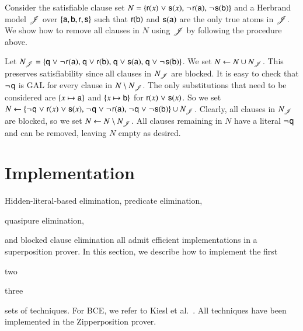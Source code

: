 \begin{exa}
   Consider the satisfiable clause set $N = \{{\mathsf{r}(x)} \mathrel{\lor}
   {\mathsf{s}(x)}{,}\; \neg{\kern.2ex \mathsf{r}(\mathsf{a})}{,}\allowbreak\;
   \neg{\kern.2ex \mathsf{s}(\mathsf{b})}\}$ and a Herbrand model $\mathscr{J}$ over
   $\{\mathsf{a}, \mathsf{b}, \mathsf{r}, \mathsf{s}\}$ such that
   $\mathsf{r}(\mathsf{b})$ and $\mathsf{s}(\mathsf{a})$ are the only true atoms in
   $\mathscr{J}$. We show how to remove all clauses in $N$ using $\mathscr{J}$ 
   by following the procedure above.

   Let $N_{\mathscr{J}} = \{ \mathsf{q} \mathrel{\lor} \neg{\kern.2ex \mathsf{r}(\mathsf{a})}{,}\; \mathsf{q}
   \mathrel{\lor} {\mathsf{r}(\mathsf{b})}{,}\; \mathsf{q} \mathrel{\lor}
   {\mathsf{s}(\mathsf{a})}{,}\; \mathsf{q} \mathrel{\lor} \neg{\kern.2ex \mathsf{s}(\mathsf{b})}
   \}$. We set $N \gets N \cup N_{\mathscr{J}}$. This preserves satisfiability
   since all clauses in $N_{\mathscr{J}}$ are blocked. It is easy to check that
   $\neg{\kern.2ex \mathsf{q}}$ is GAL for every clause in $N \setminus N_{\mathscr{J}}$. The
   only substitutions that need to be considered are $\{x \mapsto \mathsf{a} \}$ and $\{x \mapsto
   \mathsf{b} \}$ for ${\mathsf{r}(x)} \mathrel{\lor} {\mathsf{s}(x)}$.
   So we set $N \gets \{\neg{\kern.2ex \mathsf{q}} \mathrel{\lor} {\mathsf{r}(x)} \mathrel{\lor} {\mathsf{s}(x)}{,}\;
   \neg{\kern.2ex \mathsf{q}} \mathrel{\lor} \neg{\kern.2ex \mathsf{r}(\mathsf{a})}{,}\;
   \neg{\kern.2ex \mathsf{q}} \mathrel{\lor} \neg{\kern.2ex \mathsf{s}(\mathsf{b})}\} \cup N_{\mathscr{J}}$.
   Clearly, all clauses in $N_{\mathscr{J}}$ are blocked, so we set $N \gets N \setminus
   N_{\mathscr{J}}$. All clauses remaining in $N$ have a literal $\neg{\kern.2ex \mathsf{q}}$
   and can be removed, leaving $N$ empty as desired.
\end{exa}

\section{Implementation}
\label{sec:satfol:implementation}

\newcommand{\impmap}{\textit{Imp}}

Hidden-literal-based elimination, predicate elimination, \begin{qle}quasipure
elimination, \end{qle}and blocked clause
elimination all admit efficient implementations in a superposition
prover. In this section, we describe how to implement the first
\begin{noqle}two\end{noqle}\begin{qle}three\end{qle} sets of
techniques. For BCE, we refer to Kiesl et al.\ \cite{ksstb-2017-blockedfol}.
All techniques have been implemented in the Zipperposition prover.

